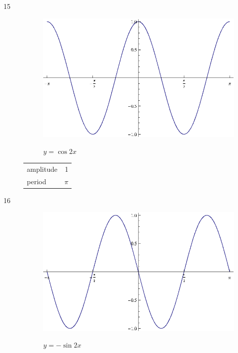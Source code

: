 \documentclass{exam}
\begin{document}
\begin{description}
      \item[15]
        \begin{figure}[H]
          \centering
          \includegraphics[scale=0.8]{exercise15.eps}

          $y = \cos 2x$
        \end{figure}

        \begin{tabular}[H]{lr}
          \toprule
          amplitude & 1 \\
          period    & $\pi$ \\
          \bottomrule
        \end{tabular}

      \item[16]
        \begin{figure}[H]
          \centering
          \includegraphics[scale=0.9]{exercise16.eps}

          $y = - \sin 2x$
        \end{figure}


\end{description}
\end{document}
